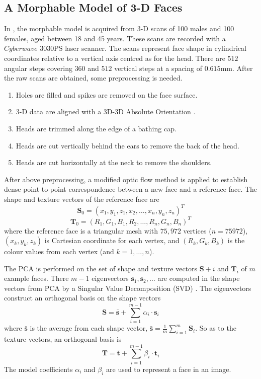 \subsection{A Morphable Model of 3-D Faces}
In \cite{Blanz2003}, the morphable model is acquired from 3-D scans of 100 males and 100 females, aged between 18 and 45 years. These scans are recorded with a $Cyberwave$ 3030PS laser scanner. The scans represent face shape in cylindrical coordinates relative to a vertical axis centred as for the head. There are $512$ angular steps covering $360$ and $512$ vertical steps at a spacing of $0.615$mm. After the raw scans are obtained, some preprocessing is needed. 
\begin{enumerate}
 \item Holes are filled and spikes are removed on the face surface.
 \item 3-D data are aligned with a 3D-3D Absolute Orientation \cite{Haralick1992}.
 \item Heads are trimmed along the edge of a bathing cap.
 \item Heads are cut vertically behind the ears to remove the back of the head.
 \item Heads are cut horizontally at the neck to remove the shoulders.
\end{enumerate}
After above preprocessing, a modified optic flow method \cite{Horn1981,Bergen1990} is applied to establish dense point-to-point correspondence between a new face and a reference face. The shape and texture vectors of the reference face are
\begin{equation}
 \mathbf{S}_0 = (x_1,y_1,z_1,x_2,\ldots,x_n,y_n,z_n)^T
\end{equation}
\begin{equation}
 \mathbf{T}_0 = (R_1,G_1,B_1,R_2,\ldots,R_n,G_n,B_n)^T
\end{equation}
where the reference face is a triangular mesh with $75,972$ vertices ($n=75972$), $(x_k,y_k,z_k)$ is Cartesian coordinate for each vertex, and $(R_k,G_k,B_k)$ is the colour values from each vertex (and $k=1,\ldots,n$).

The PCA is performed on the set of shape and texture vectors $\mathbf{S}+i$ and $\mathbf{T}_i$ of $m$ example faces. There $m-1$ eigenvectors $\mathbf{s}_1,\mathbf{s}_2,\ldots$ are computed in the shape vectors from PCA by a Singular Value Decomposition (SVD) \cite{Press1992}. The eigenvectors construct an orthogonal basis on the shape vectors 
\begin{equation}
 \mathbf{S} = \bar{\mathbf{s}}+\sum_{i=1}^{m-1}\alpha_i\cdot \mathbf{s}_i
\end{equation}
where $\bar{\mathbf{s}}$ is the average from each shape vector, $\bar{\mathbf{s}}= \frac{1}{m}\sum_{i=1}^m \mathbf{S}_i$. So as to the texture vectors, an orthogonal basis is
\begin{equation}
 \mathbf{T} = \bar{\mathbf{t}}+\sum_{i=1}^{m-1}\beta_i\cdot \mathbf{t}_i
\end{equation}
The model coefficients $\alpha_i$ and $\beta_i$ are used to represent a face in an image.
